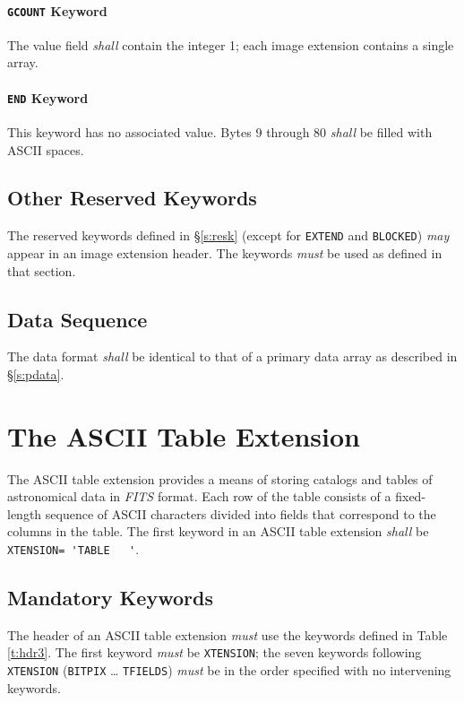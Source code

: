 \documentclass[11pt,makeidx]{book}     %
\begin{document}
   \paragraph{{\tt GCOUNT} Keyword}
 The value field {\em shall} contain the integer 1; each
 image extension contains a single array.
  
   \paragraph{{\tt END} Keyword}
 This keyword has no associated value.  Bytes 9 through 80
 {\em shall} be filled with ASCII spaces.
  
                        
   \subsection{Other Reserved Keywords}  

The reserved keywords defined in  \S\ref{s:resk} (except for {\tt EXTEND}
and {\tt BLOCKED}) {\em may} appear in an
image extension header.  The keywords {\em must} be used as defined in 
that section.

   \subsection{Data Sequence}
   The data format {\em shall} be identical to that of a primary data array 
   as described in \S\ref{s:pdata}.


\newpage


  \section{The ASCII Table Extension}
     \label{s:ATabl}

The ASCII table extension  provides a means of storing 
catalogs and tables
of astronomical data in {\em FITS\/} format.  Each row of the table consists 
of a fixed-length sequence of ASCII characters divided into fields that 
correspond to the columns in the table.
The first keyword in an ASCII table extension {\em shall}
be {\verb*+XTENSION= 'TABLE   '+}.  
   
   \subsection{Mandatory Keywords}
       \label{s:atmk}
   The header of an ASCII table
   extension {\em must} use the keywords defined in Table \ref{t:hdr3}.
   The first keyword {\em must} be {\tt XTENSION}; 
   the seven keywords following {\tt XTENSION} ({\tt BITPIX} \ldots
   {\tt TFIELDS}) {\em must} be in the 
   order specified
   with no intervening keywords.
\end{document}
